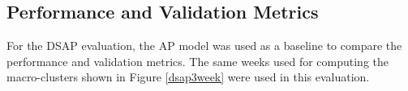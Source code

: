












\subsection{Performance and Validation Metrics}

For the DSAP evaluation, the AP model was used as a baseline to compare the performance and validation metrics. The same weeks used for computing the macro-clusters shown in Figure \ref{dsap3week} were used in this evaluation.



